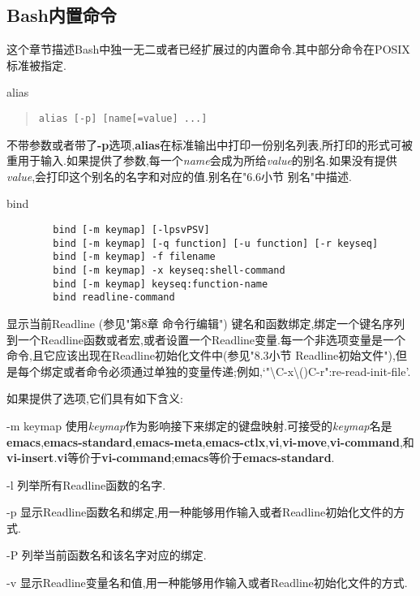 \documentclass[draft,openany]{book}
\begin{document}
\begin{CJK}{UTF8}{gbsn}
    \section{Bash内置命令}
    这个章节描述Bash中独一无二或者已经扩展过的内置命令.其中部分命令在POSIX标准被指定.
    \begin{basedescript}{\desclabelstyle{\nextlinelabel}\desclabelwidth{2.5em}}
    \item[alias]
        \begin{quote}
            \verb+alias [-p] [name[=value] ...]+
        \end{quote}
        不带参数或者带了\textbf{-p}选项,\textbf{alias}在标准输出中打印一份别名列表,所打印的形式可被重用于输入.如果提供了参数,每一个\emph{name}会成为所给\emph{value}的别名.如果没有提供\emph{value},会打印这个别名的名字和对应的值.别名在"6.6小节 别名"中描述.
    \item[bind]
        \begin{verbatim}
        bind [-m keymap] [-lpsvPSV]
        bind [-m keymap] [-q function] [-u function] [-r keyseq]
        bind [-m keymap] -f filename
        bind [-m keymap] -x keyseq:shell-command
        bind [-m keymap] keyseq:function-name
        bind readline-command
        \end{verbatim}
        显示当前Readline (参见"第8章 命令行编辑") 键名和函数绑定,绑定一个键名序列到一个Readline函数或者宏,或者设置一个Readline变量.每一个非选项变量是一个命令,且它应该出现在Readline初始化文件中(参见"8.3小节 Readline初始文件"),但是每个绑定或者命令必须通过单独的变量传递;例如,`"\textbackslash{}C-x\textbackslash()C-r":re-read-init-file'.\par
        如果提供了选项,它们具有如下含义:
        \begin{basedescript}{\desclabelstyle{\nextlinelabel}\desclabelwidth{2.5em}}
        \item[-m keymap] 使用\emph{keymap}作为影响接下来绑定的键盘映射.可接受的\emph{keymap}名是\textbf{emacs},\textbf{emacs-standard},\textbf{emacs-meta},\textbf{emacs-ctlx},\textbf{vi},\textbf{vi-move},\textbf{vi-command},和\textbf{vi-insert}.\textbf{vi}等价于\textbf{vi-command};\textbf{emacs}等价于\textbf{emacs-standard}.
        \item[-l] 列举所有Readline函数的名字.
        \item[-p] 显示Readline函数名和绑定,用一种能够用作输入或者Readline初始化文件的方式.
        \item[-P] 列举当前函数名和该名字对应的绑定.
        \item[-v] 显示Readline变量名和值,用一种能够用作输入或者Readline初始化文件的方式.

\end{basedescript}
\end{basedescript}
\end{CJK}
\end{document}
